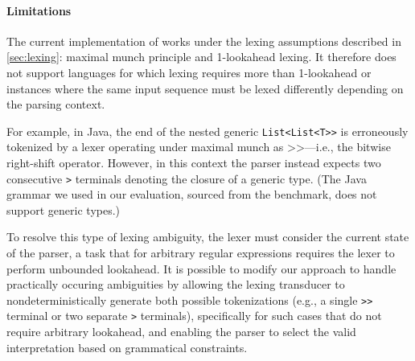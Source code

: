 \paragraph{Limitations}

The current implementation of \name works under the lexing assumptions described in \autoref{sec:lexing}: maximal munch principle and 1-lookahead lexing. 
% 
It therefore does not support languages for which lexing requires more than 1-lookahead or instances where the same input sequence must be lexed differently depending on the parsing context.

For example, in Java, the end of the nested generic \texttt{List<List<T>{}>} is erroneously tokenized by a lexer operating under maximal munch as $\texttt{>{}>}$---i.e., the bitwise  right-shift operator. However, in this context the parser instead expects two consecutive \texttt{>} terminals denoting the closure of a generic type. (The Java grammar we used in our evaluation, sourced from the \syncode benchmark, does not support generic types.)

To resolve this type of lexing ambiguity, the lexer must consider the current state of the parser, a task that for arbitrary regular expressions requires the lexer to perform unbounded lookahead.
% 
It is possible to modify our approach to handle practically occuring ambiguities by allowing the lexing transducer to nondeterministically generate both possible tokenizations (e.g., a single \texttt{>{}>} terminal or two separate \texttt{>} terminals), specifically for such cases that do not require arbitrary lookahead, and enabling the parser to select the valid interpretation based on grammatical constraints.